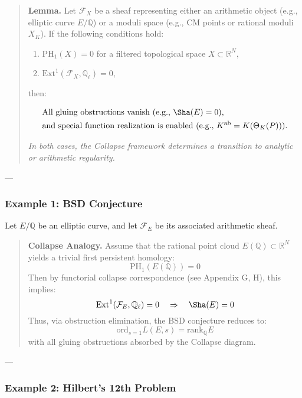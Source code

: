 \documentclass[11pt]{article}
\begin{document}
\begin{axiom}
\begin{axiom}
{{\begin{quote}
\textbf{Lemma.}  
Let \( \mathcal{F}_X \) be a sheaf representing either an arithmetic object (e.g., elliptic curve \( E/\mathbb{Q} \))  
or a moduli space (e.g., CM points or rational moduli \( X_K \)).  
If the following conditions hold:

\begin{enumerate}
  \item \( \mathrm{PH}_1(X) = 0 \) for a filtered topological space \( X \subset \mathbb{R}^N \),
  \item \( \mathrm{Ext}^1(\mathcal{F}_X, \mathbb{Q}_\ell) = 0 \),
\end{enumerate}

then:

\[
\begin{aligned}
& \text{All gluing obstructions vanish (e.g., } \Sha(E) = 0 \text{),} \\
& \text{and special function realization is enabled (e.g., } 
K^{\mathrm{ab}} = K(\Theta_K(P)) \text{).}
\end{aligned}
\]

\textit{In both cases, the Collapse framework determines a transition to analytic or arithmetic regularity.}
\end{quote}

---

\subsubsection*{Example 1: BSD Conjecture}

Let \( E/\mathbb{Q} \) be an elliptic curve, and let \( \mathcal{F}_E \) be its associated arithmetic sheaf.

\begin{quote}
\textbf{Collapse Analogy.}  
Assume that the rational point cloud \( E(\mathbb{Q}) \subset \mathbb{R}^N \)  
yields a trivial first persistent homology:
\[
\mathrm{PH}_1(E(\mathbb{Q})) = 0
\]
Then by functorial collapse correspondence (see Appendix G, H), this implies:
\[
\mathrm{Ext}^1(\mathcal{F}_E, \mathbb{Q}_\ell) = 0 \quad \Rightarrow \quad \Sha(E) = 0
\]
Thus, via obstruction elimination, the BSD conjecture reduces to:
\[
\mathrm{ord}_{s=1} L(E,s) = \mathrm{rank}_{\mathbb{Q}} E
\]
with all gluing obstructions absorbed by the Collapse diagram.
\end{quote}

---

\subsubsection*{Example 2: Hilbert’s 12th Problem}

}}
\end{axiom}
\end{axiom}
\end{document}
